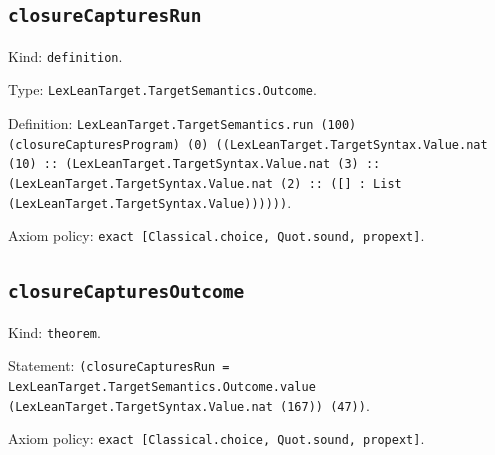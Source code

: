 \documentclass[11pt]{article}
\begin{document}
\subsection*{\texttt{closureCapturesRun}}
\noindent Kind: \texttt{definition}.\par
\noindent Type: \texttt{LexLeanTarget.TargetSemantics.Outcome}.\par
\noindent Definition: \texttt{LexLeanTarget.TargetSemantics.run (100) (closureCapturesProgram) (0) ((LexLeanTarget.TargetSyntax.Value.nat (10) :: (LexLeanTarget.TargetSyntax.Value.nat (3) :: (LexLeanTarget.TargetSyntax.Value.nat (2) :: ([] : List (LexLeanTarget.TargetSyntax.Value))))))}.\par
\noindent Axiom policy: \texttt{exact [Classical.choice, Quot.sound, propext]}.\par
\subsection*{\texttt{closureCapturesOutcome}}
\noindent Kind: \texttt{theorem}.\par
\noindent Statement: \texttt{(closureCapturesRun = LexLeanTarget.TargetSemantics.Outcome.value (LexLeanTarget.TargetSyntax.Value.nat (167)) (47))}.\par
\noindent Axiom policy: \texttt{exact [Classical.choice, Quot.sound, propext]}.\par
\end{document}
